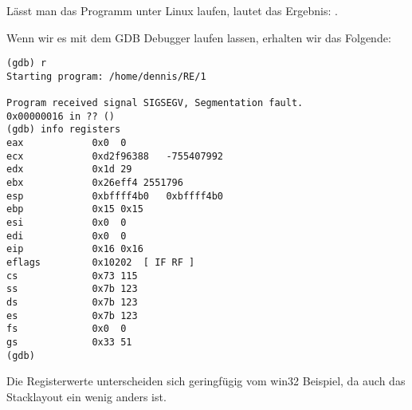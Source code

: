 Lässt man das Programm unter Linux laufen, lautet das Ergebnis: .

Wenn wir es mit dem GDB Debugger laufen lassen, erhalten wir das Folgende:


\begin{lstlisting}
(gdb) r
Starting program: /home/dennis/RE/1 

Program received signal SIGSEGV, Segmentation fault.
0x00000016 in ?? ()
(gdb) info registers
eax            0x0	0
ecx            0xd2f96388	-755407992
edx            0x1d	29
ebx            0x26eff4	2551796
esp            0xbffff4b0	0xbffff4b0
ebp            0x15	0x15
esi            0x0	0
edi            0x0	0
eip            0x16	0x16
eflags         0x10202	[ IF RF ]
cs             0x73	115
ss             0x7b	123
ds             0x7b	123
es             0x7b	123
fs             0x0	0
gs             0x33	51
(gdb) 
\end{lstlisting}
Die Registerwerte unterscheiden sich geringfügig vom win32 Beispiel, da auch das Stacklayout ein wenig anders ist.
